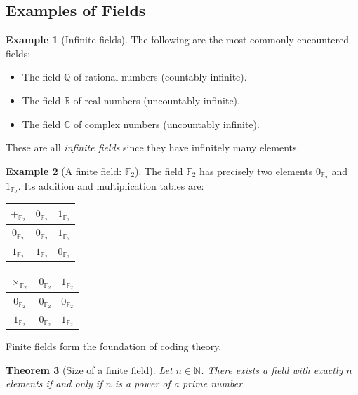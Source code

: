 \documentclass[11pt, a4paper, notitlepage]{report}
\newtheorem{theorem}{Theorem}[section]
\theoremstyle{definition}
\newtheorem{example}[theorem]{Example}
\theoremstyle{remark}
\begin{document}
\subsection{Examples of Fields}

\begin{example}[Infinite fields]\label{ex:infinite-fields}
The following are the most commonly encountered fields:
\begin{itemize}
  \item The field $\mathbb{Q}$ of rational numbers (countably infinite).
  \item The field $\mathbb{R}$ of real numbers (uncountably infinite).
  \item The field $\mathbb{C}$ of complex numbers (uncountably infinite).
\end{itemize}
These are all \emph{infinite fields} since they have infinitely many elements.
\end{example}

\begin{example}[A finite field: $\mathbb{F}_2$]\label{ex:F2}
The field $\mathbb{F}_2$ has precisely two elements $0_{\mathbb{F}_2}$ and $1_{\mathbb{F}_2}$. Its addition and multiplication tables are:

\begin{center}
\begin{tabular}{c||c|c}
$+_{\mathbb{F}_2}$ & $0_{\mathbb{F}_2}$ & $1_{\mathbb{F}_2}$ \\\hline\hline
$0_{\mathbb{F}_2}$ & $0_{\mathbb{F}_2}$ & $1_{\mathbb{F}_2}$ \\\hline
$1_{\mathbb{F}_2}$ & $1_{\mathbb{F}_2}$ & $0_{\mathbb{F}_2}$
\end{tabular}
\qquad
\begin{tabular}{c||c|c}
$\times_{\mathbb{F}_2}$ & $0_{\mathbb{F}_2}$ & $1_{\mathbb{F}_2}$ \\\hline\hline
$0_{\mathbb{F}_2}$ & $0_{\mathbb{F}_2}$ & $0_{\mathbb{F}_2}$ \\\hline
$1_{\mathbb{F}_2}$ & $0_{\mathbb{F}_2}$ & $1_{\mathbb{F}_2}$
\end{tabular}
\end{center}
Finite fields form the foundation of coding theory.
\end{example}

\begin{theorem}[Size of a finite field]\label{thm:finite-field-size}
Let $n \in \mathbb{N}$. There exists a field with exactly $n$ elements if and only if $n$ is a power of a prime number.
\end{theorem}
\end{document}
